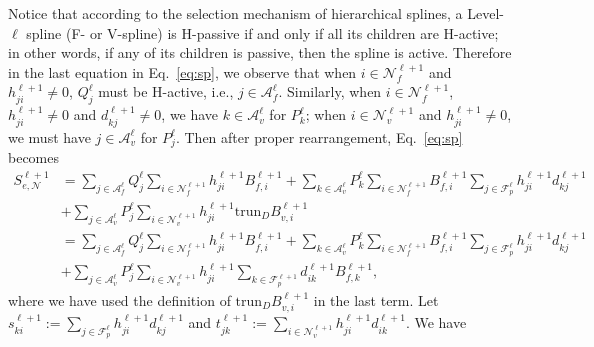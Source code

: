 \documentclass[graybox]{svmult}
\begin{document}
Notice that according to the selection mechanism of hierarchical splines, a Level-$\ell$ spline (F- or V-spline) is H-passive if and only if all its children are H-active; in other words, if any of its children is passive, then the spline is active. Therefore in the last equation in Eq.~\eqref{eq:sp}, we observe that when $i\in\mathcal{N}_f^{\ell+1}$ and $h_{ji}^{\ell+1}\neq 0$, $Q_j^\ell$ must be H-active, i.e., $j\in\mathcal{A}_f^\ell$. Similarly, when $i\in\mathcal{N}_f^{\ell+1}$, $h_{ji}^{\ell+1}\neq 0$ and $d_{kj}^{\ell+1}\neq 0$, we have $k\in\mathcal{A}_v^\ell$ for $P_k^\ell$; when $i\in\mathcal{N}_v^{\ell+1}$ and $h_{ji}^{\ell+1}\neq 0$, we must have $j\in\mathcal{A}_v^\ell$ for $P_j^\ell$. Then after proper rearrangement, Eq.~\eqref{eq:sp} becomes
\begin{equation}
\begin{aligned}
S_{e,\mathcal{N}}^{\ell+1} &=\sum_{j\in\mathcal{A}_f^{\ell}} Q_j^{\ell}  \sum_{i\in \mathcal{N}_f^{\ell+1}} h_{ji}^{\ell+1} B_{f\!,i}^{\ell+1}  + \sum_{k\in\mathcal{A}_v^\ell} P_k^{\ell}  \sum_{i\in \mathcal{N}_f^{\ell+1}} B_{f\!,i}^{\ell+1} \sum_{j\in\mathcal{F}_p^{\ell}} h_{ji}^{\ell+1} d_{kj}^{\ell+1}  \\
&+ \sum_{j\in\mathcal{A}_v^\ell} P_j^{\ell}  \sum_{i\in\mathcal{N}_v^{\ell+1}}  h_{ji}^{\ell+1} \mathrm{trun}_D B_{v,i}^{\ell+1}\\
&=\sum_{j\in\mathcal{A}_f^{\ell}} Q_j^{\ell}  \sum_{i\in \mathcal{N}_f^{\ell+1}} h_{ji}^{\ell+1} B_{f\!,i}^{\ell+1}  + \sum_{k\in\mathcal{A}_v^\ell} P_k^{\ell}  \sum_{i\in \mathcal{N}_f^{\ell+1}} B_{f\!,i}^{\ell+1} \sum_{j\in\mathcal{F}_p^{\ell}} h_{ji}^{\ell+1} d_{kj}^{\ell+1}  \\
&+ \sum_{j\in\mathcal{A}_v^\ell} P_j^{\ell}  \sum_{i\in\mathcal{N}_v^{\ell+1}}  h_{ji}^{\ell+1} \sum_{k\in\mathcal{F}_p^{\ell+1}} d_{ik}^{\ell+1} B_{f\!,k}^{\ell+1},
\end{aligned}
\label{eq:sp1}
\end{equation}
where we have used the definition of $\mathrm{trun}_D B_{v,i}^{\ell+1}$ in the last term.
Let $s_{ki}^{\ell+1}:=\sum_{j\in\mathcal{F}_p^{\ell}} h_{ji}^{\ell+1} d_{kj}^{\ell+1}$ and $t_{jk}^{\ell+1}:=\sum_{i\in\mathcal{N}_v^{\ell+1}} h_{ji}^{\ell+1} d_{ik}^{\ell+1}$. We have
\end{document}
